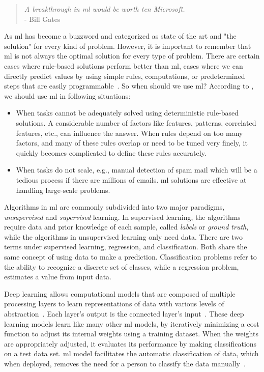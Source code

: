 \begin{quote}
    \emph{A breakthrough in \acl{ml} would be worth ten Microsoft.} \\- Bill Gates
\end{quote}

As \ac{ml} has become a buzzword and categorized as state of the art and "the solution" for every kind of problem. However, it is important to remember that \ac{ml} is not always the optimal solution for every type of problem. There are certain cases where rule-based solutions perform better than \ac{ml}, cases where we can directly predict values by using simple rules, computations, or predetermined steps that are easily programmable~\cite{aws}. So when should we use \ac{ml}? According to \cite{aws}, we should use \ac{ml} in following situations:

\begin{itemize}
    \item When tasks cannot be adequately solved using deterministic rule-based solutions. A considerable number of factors like features, patterns, correlated features, etc., can influence the answer. When rules depend on too many factors, and many of these rules overlap or need to be tuned very finely, it quickly becomes complicated to define these rules accurately.
    \item When tasks do not scale, e.g., manual detection of spam mail which will be a tedious process if there are millions of emails. \ac{ml} solutions are effective at handling large-scale problems.
\end{itemize}

Algorithms in \Ac{ml} are commonly subdivided into two major paradigms, \emph{unsupervised} and \emph{supervised} learning. In supervised learning, the algorithms require data and prior knowledge of each sample, called \emph{labels} or \emph{ground truth}, while the algorithms in unsupervised learning only need data. There are two terms under supervised learning, regression, and classification. Both share the same concept of using data to make a prediction. Classification problems refer to the ability to recognize a discrete set of classes, while a regression problem, estimates a value from input data.

Deep learning allows computational models that are composed of multiple processing layers to learn representations of data with various levels of abstraction~\cite{lecun2015deep}. Each layer's output is the connected layer's input~\cite{mike_voets}. These deep learning models learn like many other \ac{ml} models, by iteratively minimizing a cost function to adjust its internal weights using a training dataset. When the weights are appropriately adjusted, it evaluates its performance by making classifications on a test data set. \ac{ml} model facilitates the automatic classification of data, which when deployed, removes the need for a person to classify the data manually~\cite{mike_voets}.

